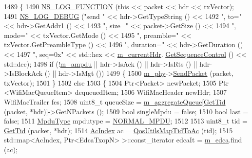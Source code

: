 \begin{DoxyCode}
1489 \{
1490   \hyperlink{log-macros-disabled_8h_a90b90d5bad1f39cb1b64923ea94c0761}{NS\_LOG\_FUNCTION} (\textcolor{keyword}{this} << packet << hdr << txVector);
1491   \hyperlink{group__logging_ga413f1886406d49f59a6a0a89b77b4d0a}{NS\_LOG\_DEBUG} (\textcolor{stringliteral}{"send "} << hdr->GetTypeString () <<
1492                 \textcolor{stringliteral}{", to="} << hdr->GetAddr1 () <<
1493                 \textcolor{stringliteral}{", size="} << packet->GetSize () <<
1494                 \textcolor{stringliteral}{", mode="} << txVector.GetMode  () <<
1495                 \textcolor{stringliteral}{", preamble="} << txVector.GetPreambleType () <<
1496                 \textcolor{stringliteral}{", duration="} << hdr->GetDuration () <<
1497                 \textcolor{stringliteral}{", seq=0x"} << std::hex << \hyperlink{classns3_1_1MacLow_aec9902bc8026338baf261d2de8fcd83b}{m\_currentHdr}.
      \hyperlink{classns3_1_1WifiMacHeader_a9d6c7e809271331e5271d29e58800593}{GetSequenceControl} () << std::dec);
1498   \textcolor{keywordflow}{if} (!\hyperlink{classns3_1_1MacLow_a59c50cdd4a959f8dfc629d6df2e3cc00}{m\_ampdu} || hdr->IsAck () || hdr->IsRts () || hdr->IsBlockAck () || hdr->IsMgt ())
1499     \{
1500       \hyperlink{classns3_1_1MacLow_aec8aefec9501f9d7c06b6cd0ee1353ee}{m\_phy}->\hyperlink{classns3_1_1WifiPhy_a4caf22eb334a9caca21ec37d90a74ce2}{SendPacket} (packet, txVector);
1501     \}
1502   \textcolor{keywordflow}{else}
1503     \{
1504       Ptr<Packet> newPacket;
1505       Ptr <WifiMacQueueItem> dequeuedItem;
1506       WifiMacHeader newHdr;
1507       WifiMacTrailer fcs;
1508       uint8\_t queueSize = \hyperlink{classns3_1_1MacLow_a50ea30f5dff00a3ef2683b9275717c6f}{m\_aggregateQueue}[\hyperlink{group__wifi_ga92cc18e2c5aa6bed3728860bbad76ff8}{GetTid} (packet, *hdr)]->GetNPackets ();
1509       \textcolor{keywordtype}{bool} singleMpdu = \textcolor{keyword}{false};
1510       \textcolor{keywordtype}{bool} last = \textcolor{keyword}{false};
1511       \hyperlink{namespacens3_ae617d41bbd0c07fa58ee2306f687b055}{MpduType} mpdutype = \hyperlink{namespacens3_ae617d41bbd0c07fa58ee2306f687b055a1fa7c2077d3b19b000b35004914f50eb}{NORMAL\_MPDU};
1512 
1513       uint8\_t tid = \hyperlink{group__wifi_ga92cc18e2c5aa6bed3728860bbad76ff8}{GetTid} (packet, *hdr);
1514       \hyperlink{group__wifi_gab422b4562ba272b39a9b6bca3513f3ac}{AcIndex} ac = \hyperlink{group__wifi_ga4e36efcff6dd83eaee42e1af0de43d48}{QosUtilsMapTidToAc} (tid);
1515       std::map<AcIndex, Ptr<EdcaTxopN> >::const\_iterator edcaIt = \hyperlink{classns3_1_1MacLow_a754751ba4152c9337611a5f015045a44}{m\_edca}.find (ac);

\end{DoxyCode}
